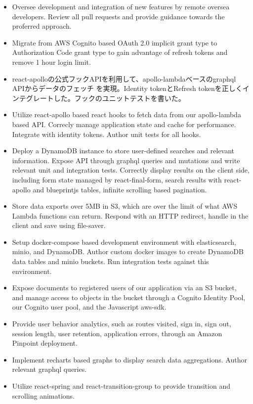\documentclass{res}
\begin{document}
\begin{resume}
\begin{position}
 \begin{itemize} \itemsep -2pt %
  \item Oversee development and integration of new features by remote oversea developers.
    Review all pull requests and provide guidance towards the proferred approach.
  \item Migrate from AWS Cognito based OAuth 2.0 implicit grant type to Authorization Code grant type
    to gain advantage of refresh tokens and remove 1 hour login limit.
  \item react-apolloの公式フックAPIを利用して、apollo-lambdaベースのgraphql APIからデータのフェッチ
    を実現。Identity tokenとRefresh tokenを正しくインテグレートした。フックのユニットテストを書いた。
  \item Utilize react-apollo based react hooks to fetch data from our apollo-lambda based API.
    Correcly manage application state and cache for performance. Integrate with identity tokens.
    Author unit tests for all hooks.
  \item Deploy a DynamoDB instance to store user-defined searches and relevant information.
    Expose API through graphql queries and mutations and write relevant unit and integration tests.
    Correctly display results on the client side, including form state managed by react-final-form,
    search results with react-apollo and blueprintjs tables, infinite scrolling based pagination.
  \item Store data exports over 5MB in S3, which are over the limit of what AWS Lambda
    functions can return. Respond with an HTTP redirect, handle in the client and save using file-saver.
  \item Setup docker-compose based development environment with elasticsearch, minio, and DynamoDB.
    Author custom docker images to create DynamoDB data tables and minio buckets. Run integration tests
    against this environment.
  \item Expose documents to registered users of our application via an S3 bucket, and manage access to objects
    in the bucket through a Cognito Identity Pool, our Cognito user pool, and the Javascript aws-sdk.
  \item Provide user behavior analytics, such as routes visited, sign in, sign out, session length, user retention,
    application errors, through an Amazon Pinpoint deployment.
  \item Implement recharts based graphs to display search data aggregations. Author relevant graphql queries.
  \item Utilize react-spring and react-transition-group to provide transition and scrolling animations.
 \end{itemize}
\end{position}


\end{resume}
\end{document}
